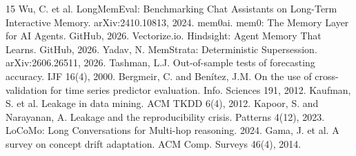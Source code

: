 \documentclass[sigconf,nonacm]{acmart}
\begin{document}
\begin{thebibliography}{15}
 Wu, C. et al. LongMemEval: Benchmarking Chat Assistants on Long-Term Interactive Memory. arXiv:2410.10813, 2024.
 mem0ai. mem0: The Memory Layer for AI Agents. GitHub, 2026.
 Vectorize.io. Hindsight: Agent Memory That Learns. GitHub, 2026.
 Yadav, N. MemStrata: Deterministic Supersession. arXiv:2606.26511, 2026.
 Tashman, L.J. Out-of-sample tests of forecasting accuracy. IJF 16(4), 2000.
 Bergmeir, C. and Benítez, J.M. On the use of cross-validation for time series predictor evaluation. Info. Sciences 191, 2012.
 Kaufman, S. et al. Leakage in data mining. ACM TKDD 6(4), 2012.
 Kapoor, S. and Narayanan, A. Leakage and the reproducibility crisis. Patterns 4(12), 2023.
 LoCoMo: Long Conversations for Multi-hop reasoning. 2024.
 Gama, J. et al. A survey on concept drift adaptation. ACM Comp. Surveys 46(4), 2014.
\end{thebibliography}
\end{document}

